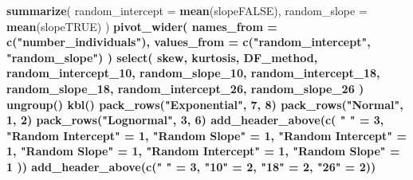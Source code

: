 \documentclass[12pt, twoside]{amherstthesis}
\newenvironment{Shaded}{\begin{snugshade}}{\end{snugshade}}
\newcommand{\DataTypeTok}[1]{\textcolor[rgb]{0.13,0.29,0.53}{#1}}
\newcommand{\DecValTok}[1]{\textcolor[rgb]{0.00,0.00,0.81}{#1}}
\newcommand{\KeywordTok}[1]{\textcolor[rgb]{0.13,0.29,0.53}{\textbf{#1}}}
\newcommand{\NormalTok}[1]{#1}
\newcommand{\OperatorTok}[1]{\textcolor[rgb]{0.81,0.36,0.00}{\textbf{#1}}}
\newcommand{\StringTok}[1]{\textcolor[rgb]{0.31,0.60,0.02}{#1}}
\begin{document}
\begin{Shaded}
\begin{Highlighting}[]
{{{{{{{{{{{{{{{{{{{{{{{{{{{{{{{{{{{{{{{{{{{{{{{{{{{{{{{\StringTok{  }\KeywordTok{summarize}\NormalTok{(}
    \DataTypeTok{random_intercept =} \KeywordTok{mean}\NormalTok{(slopeFALSE),}
    \DataTypeTok{random_slope =} \KeywordTok{mean}\NormalTok{(slopeTRUE)}
\NormalTok{  ) }\OperatorTok{%>%}
\StringTok{  }\KeywordTok{pivot_wider}\NormalTok{(}
    \DataTypeTok{names_from =} \KeywordTok{c}\NormalTok{(}\StringTok{"number_individuals"}\NormalTok{),}
    \DataTypeTok{values_from =} \KeywordTok{c}\NormalTok{(}\StringTok{"random_intercept"}\NormalTok{, }\StringTok{"random_slope"}\NormalTok{)}
\NormalTok{  ) }\OperatorTok{%>%}
\StringTok{  }\KeywordTok{select}\NormalTok{(}
\NormalTok{    skew, kurtosis, DF_method, random_intercept_}\DecValTok{10}\NormalTok{, random_slope_}\DecValTok{10}\NormalTok{, }
\NormalTok{    random_intercept_}\DecValTok{18}\NormalTok{,}
\NormalTok{    random_slope_}\DecValTok{18}\NormalTok{, random_intercept_}\DecValTok{26}\NormalTok{, random_slope_}\DecValTok{26}
\NormalTok{  ) }\OperatorTok{%>%}
\StringTok{  }\KeywordTok{ungroup}\NormalTok{() }\OperatorTok{%>%}
\StringTok{  }\KeywordTok{kbl}\NormalTok{() }\OperatorTok{%>%}
\StringTok{  }\KeywordTok{pack_rows}\NormalTok{(}\StringTok{"Exponential"}\NormalTok{, }\DecValTok{7}\NormalTok{, }\DecValTok{8}\NormalTok{) }\OperatorTok{%>%}
\StringTok{  }\KeywordTok{pack_rows}\NormalTok{(}\StringTok{"Normal"}\NormalTok{, }\DecValTok{1}\NormalTok{, }\DecValTok{2}\NormalTok{) }\OperatorTok{%>%}
\StringTok{  }\KeywordTok{pack_rows}\NormalTok{(}\StringTok{"Lognormal"}\NormalTok{, }\DecValTok{3}\NormalTok{, }\DecValTok{6}\NormalTok{) }\OperatorTok{%>%}
\StringTok{  }\KeywordTok{add_header_above}\NormalTok{(}\KeywordTok{c}\NormalTok{(}
    \StringTok{" "}\NormalTok{ =}\StringTok{ }\DecValTok{3}\NormalTok{, }\StringTok{"Random Intercept"}\NormalTok{ =}\StringTok{ }\DecValTok{1}\NormalTok{, }\StringTok{"Random Slope"}\NormalTok{ =}\StringTok{ }\DecValTok{1}\NormalTok{, }\StringTok{"Random Intercept"}\NormalTok{ =}\StringTok{ }\DecValTok{1}\NormalTok{,}
    \StringTok{"Random Slope"}\NormalTok{ =}\StringTok{ }\DecValTok{1}\NormalTok{, }\StringTok{"Random Intercept"}\NormalTok{ =}\StringTok{ }\DecValTok{1}\NormalTok{, }\StringTok{"Random Slope"}\NormalTok{ =}\StringTok{ }\DecValTok{1}
\NormalTok{  )) }\OperatorTok{%>%}
\StringTok{  }\KeywordTok{add_header_above}\NormalTok{(}\KeywordTok{c}\NormalTok{(}\StringTok{" "}\NormalTok{ =}\StringTok{ }\DecValTok{3}\NormalTok{, }\StringTok{"10"}\NormalTok{ =}\StringTok{ }\DecValTok{2}\NormalTok{, }\StringTok{"18"}\NormalTok{ =}\StringTok{ }\DecValTok{2}\NormalTok{, }\StringTok{"26"}\NormalTok{ =}\StringTok{ }\DecValTok{2}\NormalTok{)) }\OperatorTok{%>%}
}}}}}}}}}}}}}}}}}}}}}}}}}}}}}}}}}}}}}}}}}}}}}}}}}}}}}}}}}}}}}}}}}
\end{Highlighting}
\end{Shaded}
\end{document}
